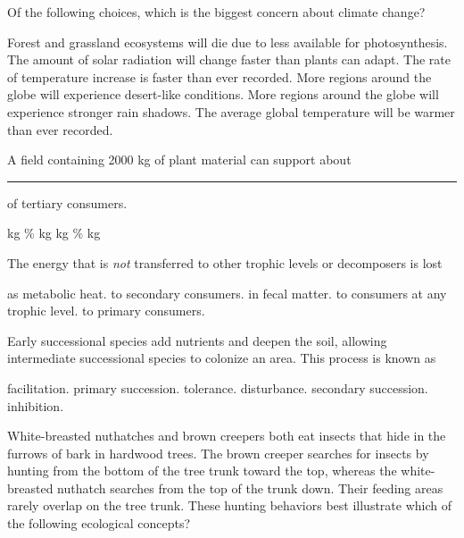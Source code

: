 \question
Of the following choices, which is the biggest concern about climate change?

\begin{choices}
\choice Forest and grassland ecosystems will die due to less  available for photosynthesis. 
\choice The amount of solar radiation will change faster than plants can adapt. 
\correctchoice The rate of temperature increase is faster than ever recorded. 
\choice More regions around the globe will experience desert-like conditions. 
\choice More regions around the globe will experience stronger rain shadows. 
\choice The average global temperature will be warmer than ever recorded.  
\end{choices}

\newpage

\question
A field containing 2000 kg of plant material can support about \rule{1in}{0.4pt} of tertiary consumers.

\begin{choices}
 kg %
\% %
 kg %
 kg %
\% %
 kg %
\end{choices}

\question
The energy that is \textit{not} transferred to other trophic levels or decomposers is lost

\begin{choices}
\correctchoice as metabolic heat.
\choice to secondary consumers.
\choice in fecal matter.
\choice to consumers at any trophic level.
\choice to primary consumers.
\end{choices}

\question
Early successional species add nutrients and deepen the soil, allowing intermediate successional species to colonize an area. This process is known as

\begin{choices}
\correctchoice facilitation. 
\choice primary succession. 
\choice tolerance. 
\choice disturbance. 
\choice secondary succession. 
\choice inhibition. 
\end{choices}

\question
White-breasted nuthatches and brown creepers both eat insects that hide in the furrows of bark in hardwood trees. The brown creeper searches for insects by hunting from the bottom of the tree trunk toward the top, whereas the white-breasted nuthatch searches from the top of the trunk down. Their feeding areas rarely overlap on the tree trunk. These hunting behaviors best illustrate which of the following ecological concepts?

